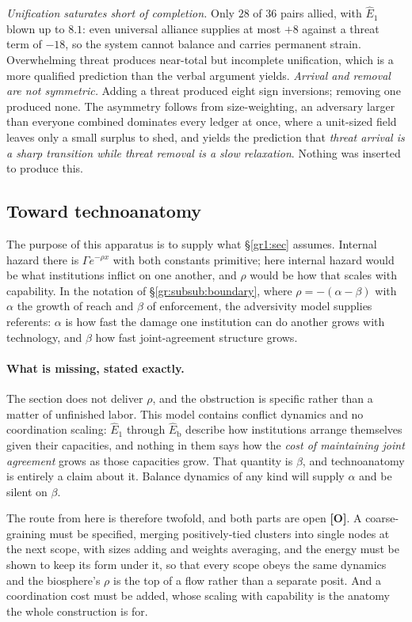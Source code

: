 \documentclass[11pt]{article}
\numberwithin{equation}{section}
\theoremstyle{plain}
\theoremstyle{definition}
\theoremstyle{remark}
\begin{document}
\emph{Unification saturates short of completion.} Only $28$ of $36$
pairs allied, with $\hat E_1$ blown up to $8.1$: even universal alliance
supplies at most $+8$ against a threat term of $-18$, so the system
cannot balance and carries permanent strain. Overwhelming threat
produces near-total but incomplete unification, which is a more
qualified prediction than the verbal argument yields. \emph{Arrival and removal are not symmetric.} Adding a threat produced
eight sign inversions; removing one produced none. The asymmetry follows
from size-weighting, an adversary larger than everyone combined
dominates every ledger at once, where a unit-sized field leaves only a
small surplus to shed, and yields the prediction that \emph{threat
arrival is a sharp transition while threat removal is a slow
relaxation}. Nothing was inserted to produce this.

\subsection{Toward technoanatomy}\label{ad:sub:toward}

The purpose of this apparatus is to supply what \S\ref{gr1:sec} assumes.
Internal hazard there is $\Gamma e^{-\rho x}$ with both constants
primitive; here internal hazard would be what institutions inflict on
one another, and $\rho$ would be how that scales with capability. In the
notation of \S\ref{gr:subsub:boundary}, where $\rho=-(\alpha-\beta)$
with $\alpha$ the growth of reach and $\beta$ of enforcement, the
adversivity model supplies referents: $\alpha$ is how fast the damage
one institution can do another grows with technology, and $\beta$ how
fast joint-agreement structure grows.

\paragraph{What is missing, stated exactly.}\label{ad:rem:missing}
The section does not deliver $\rho$, and the obstruction is specific
rather than a matter of unfinished labor. This model contains conflict
dynamics and no coordination scaling: $\hat E_1$ through
$\hat E_{\mathrm b}$ describe how institutions arrange themselves given
their capacities, and nothing in them says how the \emph{cost of
maintaining joint agreement} grows as those capacities grow. That
quantity is $\beta$, and technoanatomy is entirely a claim about it.
Balance dynamics of any kind will supply $\alpha$ and be silent on
$\beta$.

The route from here is therefore twofold, and both parts are open
\textbf{[O]}. A coarse-graining must be specified, merging
positively-tied clusters into single nodes at the next scope, with sizes
adding and weights averaging, and the energy must be shown to keep
its form under it, so that every scope obeys the same dynamics and the
biosphere's $\rho$ is the top of a flow rather than a separate
posit. And a coordination cost must be added, whose scaling with
capability is the anatomy the whole construction is for.
\end{document}
